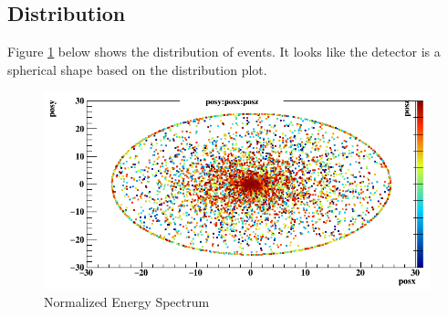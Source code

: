 \documentclass[letterpaper]{article}
\begin{document}
\subsection{Distribution}
Figure \ref{Figure3} below shows the distribution of events. It looks like the detector is a spherical shape based on the distribution plot.
\begin{figure}[htpb]
  \centering
  \includegraphics[width=.8\linewidth]{Figure3}
  \caption{Normalized Energy Spectrum}
  \label{Figure3}
\end{figure}
\end{document}
